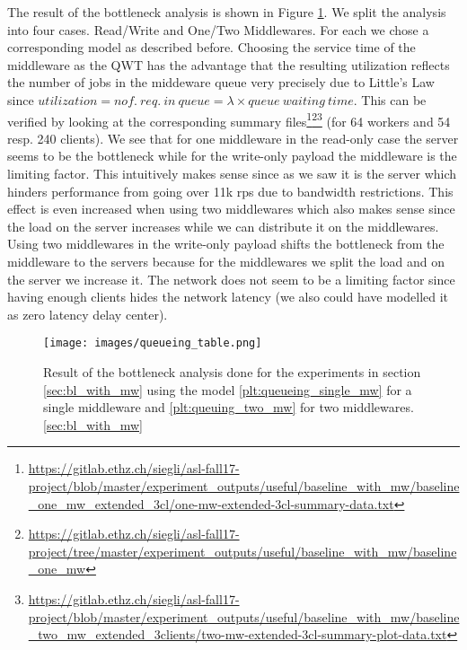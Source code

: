 \documentclass[11pt,a4paper]{article}
\begin{document}
The result of the bottleneck analysis is shown in Figure \ref{fig:queueing_bottleneck}. We split the analysis into four cases. Read/Write and One/Two Middlewares. For each we chose a corresponding model as described before. Choosing the service time of the middleware as the QWT has the advantage that the resulting utilization reflects the number of jobs in the middeware queue very precisely due to Little's Law since $utilization = nof.\ req.\ in\ queue = \lambda \times queue\ waiting\ time$. This can be verified by looking at the corresponding summary files\footnote{\url{https://gitlab.ethz.ch/siegli/asl-fall17-project/blob/master/experiment_outputs/useful/baseline_with_mw/baseline_one_mw_extended_3cl/one-mw-extended-3cl-summary-data.txt}}\footnote{\url{https://gitlab.ethz.ch/siegli/asl-fall17-project/tree/master/experiment_outputs/useful/baseline_with_mw/baseline_one_mw}}\footnote{\url{https://gitlab.ethz.ch/siegli/asl-fall17-project/blob/master/experiment_outputs/useful/baseline_with_mw/baseline_two_mw_extended_3clients/two-mw-extended-3cl-summary-plot-data.txt}} (for 64 workers and 54 resp. 240 clients). We see that for one middleware in the read-only case the server seems to be the bottleneck while for the write-only payload the middleware is the limiting factor. This intuitively makes sense since as we saw it is the server which hinders performance from going over 11k rps due to bandwidth restrictions. This effect is even increased when using two middlewares which also makes sense since the load on the server increases while we can distribute it on the middlewares. Using two middlewares in the write-only payload shifts the bottleneck from the middleware to the servers because for the middlewares we split the load and on the server we increase it. The network does not seem to be a limiting factor since having enough clients hides the network latency (we also could have modelled it as zero latency delay center).

\begin{figure}[H]
    \centering
    \texttt{[image: images/queueing\_table.png]}
    \caption{Result of the bottleneck analysis done for the experiments in section \ref{sec:bl_with_mw} using the model \ref{plt:queueing_single_mw} for a single middleware and \ref{plt:queuing_two_mw} for two middlewares. \ref{sec:bl_with_mw}}
    \label{fig:queueing_bottleneck}
\end{figure}


\newpage
\end{document}
